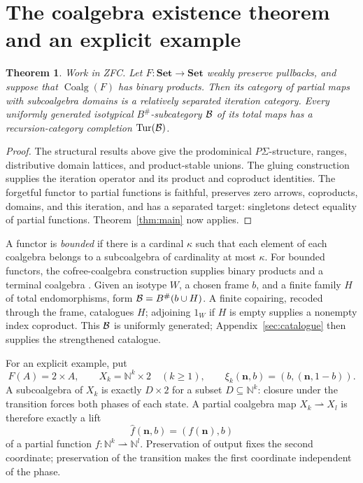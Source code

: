 \documentclass[11pt]{article}
\newtheorem{theorem}{Theorem}[section]
\begin{document}
\section{The coalgebra existence theorem and an explicit example}\label{sec:coalgebraexistence}
\begin{theorem}\label{thm:coalgebra}
Work in ZFC. Let $F:\mathbf{Set}\to\mathbf{Set}$ weakly preserve pullbacks, and suppose that $\operatorname{Coalg}(F)$ has binary products. Then its category of partial maps with subcoalgebra domains is a relatively separated iteration category. Every uniformly generated isotypical $B^\#$-subcategory $\mathcal B$ of its total maps has a recursion-category completion $\operatorname{Tur}(\mathcal B)$.
\end{theorem}
\begin{proof}
The structural results above give the prodominical $P\Sigma$-structure, ranges, distributive domain lattices, and product-stable unions. The gluing construction supplies the iteration operator and its product and coproduct identities. The forgetful functor to partial functions is faithful, preserves zero arrows, coproducts, domains, and this iteration, and has a separated target: singletons detect equality of partial functions. Theorem~\ref{thm:main} now applies.
\end{proof}

A functor is \emph{bounded} if there is a cardinal $\kappa$ such that each element of each coalgebra belongs to a subcoalgebra of cardinality at most $\kappa$. For bounded functors, the cofree-coalgebra construction supplies binary products and a terminal coalgebra \cite{GS}. Given an isotype $W$, a chosen frame $b$, and a finite family $H$ of total endomorphisms, form $\mathcal B=B^\#(b\cup H)$. A finite copairing, recoded through the frame, catalogues $H$; adjoining $1_W$ if $H$ is empty supplies a nonempty index coproduct. This $\mathcal B$ is uniformly generated; Appendix~\ref{sec:catalogue} then supplies the strengthened catalogue.

For an explicit example, put
\[
F(A)=2\times A,\qquad X_k=\mathbb N^k\times2\quad(k\geq1),\qquad
\xi_k(\mathbf n,b)=(b,(\mathbf n,1-b)).
\]
A subcoalgebra of $X_k$ is exactly $D\times2$ for a subset $D\subseteq\mathbb N^k$: closure under the transition forces both phases of each state. A partial coalgebra map $X_k\rightharpoonup X_l$ is therefore exactly a lift
\[
\widehat f(\mathbf n,b)=(f(\mathbf n),b)
\]
of a partial function $f:\mathbb N^k\rightharpoonup\mathbb N^l$. Preservation of output fixes the second coordinate; preservation of the transition makes the first coordinate independent of the phase.
\end{document}
